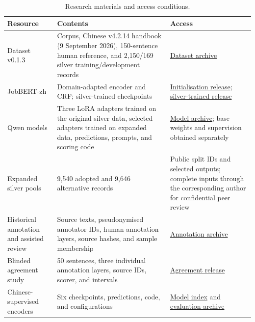 \documentclass[fleqn,12pt]{wlpeerj}
\begin{document}
\setcounter{table}{23}
\begin{table}[!htbp]
\centering\small
\caption{Research materials and access conditions.}
\label{tab:component-access}
\begin{tabularx}{\linewidth}{@{}P{.23\linewidth}L P{.29\linewidth}@{}}
\toprule
Resource & Contents & Access \\
\midrule
Dataset v0.1.3 & Corpus, Chinese v4.2.14 handbook (9 September 2026), 150-sentence human reference, and 2,150/169 silver training/development records & \href{https://doi.org/10.5281/zenodo.22698504}{Dataset archive} \\
JobBERT-zh & Domain-adapted encoder and CRF; silver-trained checkpoints & \href{https://huggingface.co/AlfredJames/jobbert-zh}{Initialisation release}; \href{https://huggingface.co/AlfredJames/jobbert-zh-v6a}{silver-trained release} \\
Qwen models & Three LoRA adapters trained on the original silver data, selected adapters trained on expanded data, predictions, prompts, and scoring code & \href{https://doi.org/10.5281/zenodo.22851581}{Model archive}; base weights and supervision obtained separately \\
Expanded silver pools & 9,540 adopted and 9,646 alternative records & Public split IDs and selected outputs; complete inputs through the corresponding author for confidential peer review \\
Historical annotation and assisted review & Source texts, pseudonymised annotator IDs, human annotation layers, source hashes, and sample membership & \href{https://github.com/AlfredJamesLi/chinese-skillspan-benchmark/blob/main/reproduction/evidence_review_20260925/annotation_layers/README.md}{Annotation archive} \\
Blinded agreement study & 50 sentences, three individual annotation layers, source IDs, scorer, and intervals & \href{https://github.com/AlfredJamesLi/chinese-skillspan-benchmark/tree/main/reproduction/agreement/finalguide_abc_20261003}{Agreement release} \\
Chinese-supervised encoders & Six checkpoints, predictions, code, and configurations & \href{https://github.com/AlfredJamesLi/chinese-skillspan-benchmark/blob/0c73207c0f9b00fa87f385b78bcb7342bd00bfcb/results_snapshots/table11_evidence_20260924/HF_RELEASE.md}{Model index} and \href{https://doi.org/10.5281/zenodo.22942441}{evaluation archive} \\
\bottomrule
\end{tabularx}
\par\smallskip\footnotesize\RaggedRight

\end{table}
\end{document}
